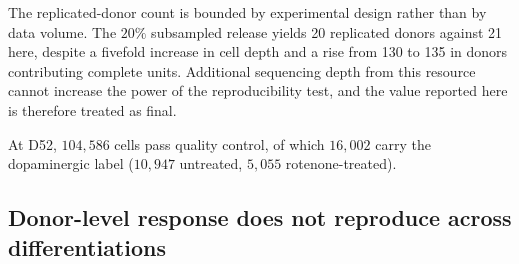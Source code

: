 \documentclass[5p,times,twocolumn]{elsarticle}
\begin{document}
The replicated-donor count is bounded by experimental design rather than by data
volume. The $20\%$ subsampled release yields 20 replicated donors against 21
here, despite a fivefold increase in cell depth and a rise from 130 to 135 in
donors contributing complete units. Additional sequencing depth from this
resource cannot increase the power of the reproducibility test, and the value
reported here is therefore treated as final.

At D52, $104{,}586$ cells pass quality control, of which $16{,}002$ carry the
dopaminergic label ($10{,}947$ untreated, $5{,}055$ rotenone-treated).

\subsection{\textbf{Donor-level response does not reproduce across differentiations}}
\label{sec:res-repro}
\end{document}
